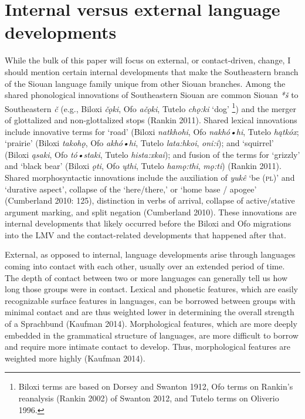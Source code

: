 \documentclass[output=paper]{LSP/langsci}
\begin{document}
\section{Internal versus external language developments}

While the bulk of this paper will focus on external, or contact-driven, change, I should mention certain internal developments that make the Southeastern branch of the Siouan language family unique from other Siouan branches. Among the shared phonological innovations of Southeastern Siouan are common Siouan \emph{*š} to Southeastern \emph{č} (e.g., Biloxi \emph{čǫki}, Ofo \emph{ačǫki}, Tutelo \emph{chǫ:ki} `dog' \footnote{Biloxi terms are based on Dorsey and Swanton 1912, Ofo terms on Rankin’s reanalysis (Rankin 2002) of Swanton 2012, and Tutelo terms on Oliverio 1996.}) and the merger of glottalized and non-glottalized stops (Rankin 2011). Shared lexical innovations include innovative terms for `road' (Biloxi \emph{natkhohi}, Ofo \emph{nakhó•hi}, Tutelo \emph{hątkóx}; `prairie' (Biloxi \emph{takohǫ}, Ofo \emph{akhó•hi}, Tutelo \emph{lata:hkoi}, \emph{oni:i}); and `squirrel' (Biloxi \emph{ąsaki}, Ofo \emph{tó•staki}, Tutelo \emph{hista:xkai}); and fusion of the terms for `grizzly' and `black bear' (Biloxi \emph{ǫti}, Ofo \emph{ųthi}, Tutelo \emph{hamǫ:thi}, \emph{mǫ:ti}) (Rankin 2011). Shared morphosyntactic innovations include the auxiliation of \emph{yukê} `be (\textsc{pl})' and `durative aspect', collapse of the `here/there,' or `home base / apogee' (Cumberland 2010: 125), distinction in verbs of arrival, collapse of active/stative argument marking, and split negation (Cumberland 2010). These innovations are internal developments that likely occurred before the Biloxi and Ofo migrations into the LMV and the contact-related developments that happened after that.

External, as opposed to internal, language developments arise through languages coming into contact with each other, usually over an extended period of time. The depth of contact between two or more languages can generally tell us how long those groups were in contact. Lexical and phonetic features, which are easily recognizable surface features in languages, can be borrowed between groups with minimal contact and are thus weighted lower in determining the overall strength of a Sprachbund (Kaufman 2014). Morphological features, which are more deeply embedded in the grammatical structure of languages, are more difficult to borrow and require more intimate contact to develop. Thus, morphological features are weighted more highly (Kaufman 2014).
\end{document}
